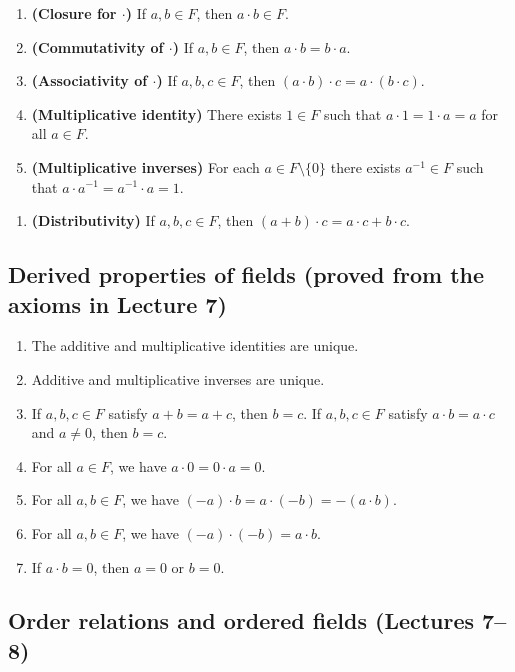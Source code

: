 \documentclass[12pt]{article}
\begin{document}
\begin{enumerate}[label=\textbf{(M\arabic*)}, leftmargin=3em, itemsep=0.25em]
\item \textbf{(Closure for $\cdot$)} If $a,b\in F$, then $a\cdot b\in F$.
\item \textbf{(Commutativity of $\cdot$)} If $a,b\in F$, then $a\cdot b=b\cdot a$.
\item \textbf{(Associativity of $\cdot$)} If $a,b,c\in F$, then $(a\cdot b)\cdot c=a\cdot(b\cdot c)$.
\item \textbf{(Multiplicative identity)} There exists $1\in F$ such that $a\cdot 1=1\cdot a=a$ for all $a\in F$.
\item \textbf{(Multiplicative inverses)} For each $a\in F\setminus\{0\}$ there exists $a^{-1}\in F$ such that
$a\cdot a^{-1}=a^{-1}\cdot a=1$.
\end{enumerate}

\begin{enumerate}[label=\textbf{(D)}, leftmargin=3em, itemsep=0.25em]
\item \textbf{(Distributivity)} If $a,b,c\in F$, then $(a+b)\cdot c=a\cdot c+b\cdot c$.
\end{enumerate}

\subsection*{Derived properties of fields (proved from the axioms in Lecture 7)} %
\begin{enumerate}[label=\textbf{(\arabic*)}, leftmargin=3em, itemsep=0.25em]
\item The additive and multiplicative identities are unique.
\item Additive and multiplicative inverses are unique.
\item If $a,b,c\in F$ satisfy $a+b=a+c$, then $b=c$. If $a,b,c\in F$ satisfy $a\cdot b=a\cdot c$ and $a\neq 0$, then $b=c$.
\item For all $a\in F$, we have $a\cdot 0=0\cdot a=0$.
\item For all $a,b\in F$, we have $(-a)\cdot b=a\cdot(-b)=-(a\cdot b)$.
\item For all $a,b\in F$, we have $(-a)\cdot(-b)=a\cdot b$.
\item If $a\cdot b=0$, then $a=0$ or $b=0$.
\end{enumerate}


\subsection*{Order relations and ordered fields (Lectures 7--8)}
\end{document}
